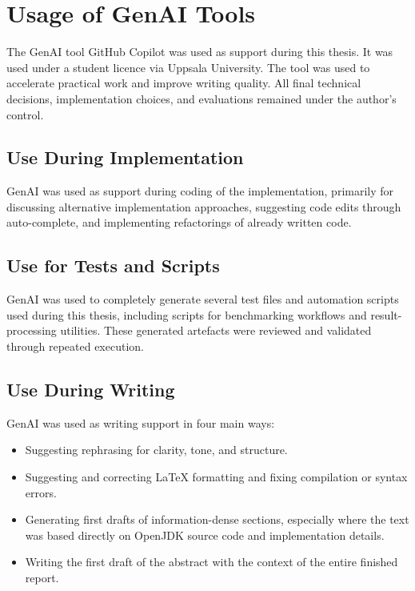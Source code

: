 \chapter{Usage of GenAI Tools}
\label{app:ai-usage}

The \ac{GenAI} tool GitHub Copilot was used as support during this thesis. It was used under a student licence via Uppsala University. The tool was used to accelerate practical work and improve writing quality. All final technical decisions, implementation choices, and evaluations remained under the author's control.

\section{Use During Implementation}
\label{app:ai-usage-implementation}

\ac{GenAI} was used as support during coding of the implementation, primarily for discussing alternative implementation approaches, suggesting code edits through auto-complete, and implementing refactorings of already written code.

\section{Use for Tests and Scripts}
\label{app:ai-usage-tests-scripts}

\ac{GenAI} was used to completely generate several test files and automation scripts used during this thesis, including scripts for benchmarking workflows and result-processing utilities. These generated artefacts were reviewed and validated through repeated execution.

\section{Use During Writing}
\label{app:ai-usage-writing}

\ac{GenAI} was used as writing support in four main ways:

\begin{itemize}
	\item Suggesting rephrasing for clarity, tone, and structure.
	\item Suggesting and correcting LaTeX formatting and fixing compilation or syntax errors.
	\item Generating first drafts of information-dense sections, especially where the text was based directly on OpenJDK source code and implementation details.
	\item Writing the first draft of the abstract with the context of the entire finished report.
\end{itemize}

